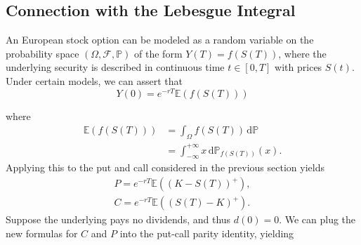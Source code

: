 \documentclass[]{article}
\newcommand{\EE}{\mathbb{E}}
\newcommand{\PP}{\mathbb{P}}
\theoremstyle{definition}
\theoremstyle{remark}
\begin{document}
\subsection{Connection with the Lebesgue Integral}
An European stock option can be modeled as a random variable on the probability space $(\Omega, \mathcal{F}, \PP)$ of the form $Y(T) = f(S(T))$, where the underlying security is described in continuous time $t\in [0,T]$ with prices $S(t)$. Under certain models\cite{capinski2004measure}, we can assert that
\begin{equation} \label{gprice}
	Y(0) = e^{-rT} \EE(f(S(T)))
\end{equation}

where
\begin{align*}
\EE(f(S(T))) &= \int_\Omega f(S(T))  \, \text{d} \PP \\
&= \int_{- \infty}^{+ \infty} x \,\text{d} \PP_{f(S(T))}(x).
\end{align*}
Applying this to the put and call considered in the previous section yields
\begin{gather*}
	P = e^{-rT} \EE((K - S(T))^+), \\
	C = e^{-rT} \EE((S(T) - K)^+).
\end{gather*}
Suppose the underlying pays no dividends, and thus $d(0)=0$. We can plug the new formulas for $C$ and $P$ into the put-call parity identity, yielding
\end{document}
